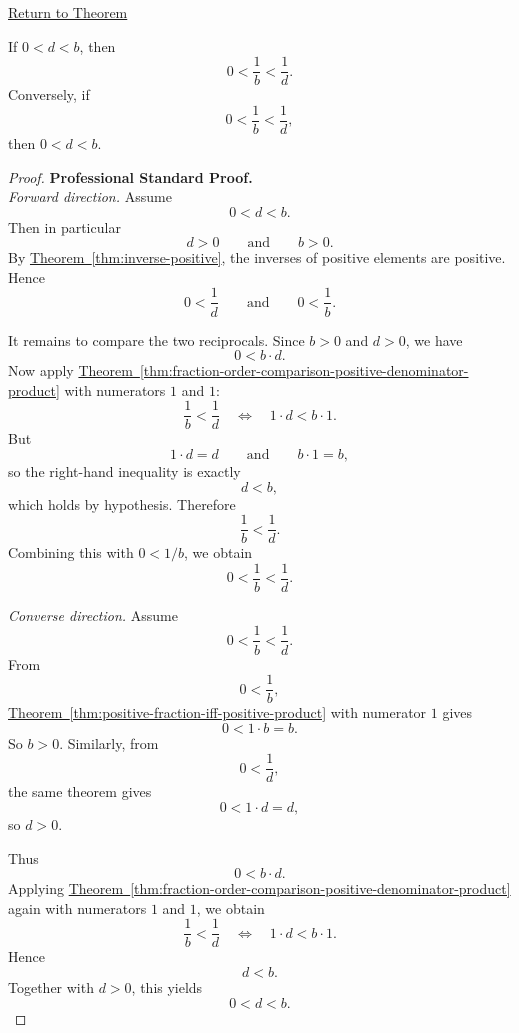 \newpage
{}
\label{prf:reciprocal-order-for-positive-elements}

\begin{remark*}[Return]
\hyperref[thm:reciprocal-order-for-positive-elements]{Return to Theorem}
\end{remark*}

\begin{theorem*}
If $0<d<b$, then
\[
0<\frac{1}{b}<\frac{1}{d}.
\]
Conversely, if
\[
0<\frac{1}{b}<\frac{1}{d},
\]
then $0<d<b$.
\end{theorem*}

\begin{proof}
\textbf{Professional Standard Proof.}~\\
\emph{Forward direction.} Assume
\[
0<d<b.
\]
Then in particular
\[
d>0
\qquad\text{and}\qquad
b>0.
\]
By \hyperref[thm:inverse-positive]{Theorem~\ref*{thm:inverse-positive}},
the inverses of positive elements are positive.  Hence
\[
0<\frac{1}{d}
\qquad\text{and}\qquad
0<\frac{1}{b}.
\]

It remains to compare the two reciprocals.  Since $b>0$ and $d>0$, we have
\[
0<b\cdot d.
\]
Now apply
\hyperref[thm:fraction-order-comparison-positive-denominator-product]{Theorem~\ref*{thm:fraction-order-comparison-positive-denominator-product}}
with numerators $1$ and $1$:
\[
\frac{1}{b}<\frac{1}{d}
\quad\Longleftrightarrow\quad
1\cdot d<b\cdot 1.
\]
But
\[
1\cdot d=d
\qquad\text{and}\qquad
b\cdot 1=b,
\]
so the right-hand inequality is exactly
\[
d<b,
\]
which holds by hypothesis.  Therefore
\[
\frac{1}{b}<\frac{1}{d}.
\]
Combining this with $0<1/b$, we obtain
\[
0<\frac{1}{b}<\frac{1}{d}.
\]

\emph{Converse direction.} Assume
\[
0<\frac{1}{b}<\frac{1}{d}.
\]
From
\[
0<\frac{1}{b},
\]
\hyperref[thm:positive-fraction-iff-positive-product]{Theorem~\ref*{thm:positive-fraction-iff-positive-product}}
with numerator $1$ gives
\[
0<1\cdot b=b.
\]
So $b>0$.  Similarly, from
\[
0<\frac{1}{d},
\]
the same theorem gives
\[
0<1\cdot d=d,
\]
so $d>0$.

Thus
\[
0<b\cdot d.
\]
Applying
\hyperref[thm:fraction-order-comparison-positive-denominator-product]{Theorem~\ref*{thm:fraction-order-comparison-positive-denominator-product}}
again with numerators $1$ and $1$, we obtain
\[
\frac{1}{b}<\frac{1}{d}
\quad\Longleftrightarrow\quad
1\cdot d<b\cdot 1.
\]
Hence
\[
d<b.
\]
Together with $d>0$, this yields
\[
0<d<b.
\]
\end{proof}

